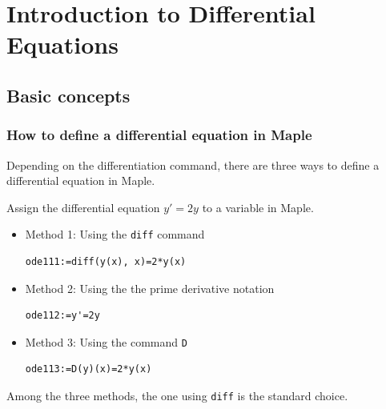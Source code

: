 \documentclass[
  12pt]{elegantbook}
\begin{document}
\hypertarget{introduction-to-differential-equations}{%
\chapter{Introduction to Differential Equations}\label{introduction-to-differential-equations}}

\hypertarget{basic-concepts}{%
\section{Basic concepts}\label{basic-concepts}}

\hypertarget{how-to-define-a-differential-equation-in-maple}{%
\subsection{How to define a differential equation in Maple}\label{how-to-define-a-differential-equation-in-maple}}

Depending on the differentiation command, there are three ways to define a differential equation in Maple.

\begin{example}
Assign the differential equation \(y'=2y\) to a variable in Maple.
\end{example}

\begin{solution}

\begin{itemize}
\item
  Method 1: Using the \texttt{diff} command

\begin{verbatim}
ode111:=diff(y(x), x)=2*y(x)
\end{verbatim}
\item
  Method 2: Using the the prime derivative notation

\begin{verbatim}
ode112:=y'=2y
\end{verbatim}
\item
  Method 3: Using the command \texttt{D}

\begin{verbatim}
ode113:=D(y)(x)=2*y(x)
\end{verbatim}
\end{itemize}

\end{solution}

Among the three methods, the one using \texttt{diff} is the standard choice.
\end{document}
